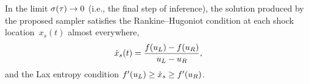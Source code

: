 \begin{theorem}
\label{appx-thm:shock-location}
In the limit $\sigma(\tau) \to 0$ (i.e., the final step of inference), the solution produced by the
proposed sampler satisfies the Rankine--Hugoniot condition at each shock location~$x_{s}(t)$
almost everywhere,
\begin{equation}
\label{eq:rh-appx}
\dot x_{s}(t) = \frac{f(u_{L}) - f(u_{R})}{u_{L} - u_{R}},
\end{equation}
and the Lax entropy condition $f'(u_{L}) \ge \dot x_{s} \ge f'(u_{R})$.
\end{theorem}

